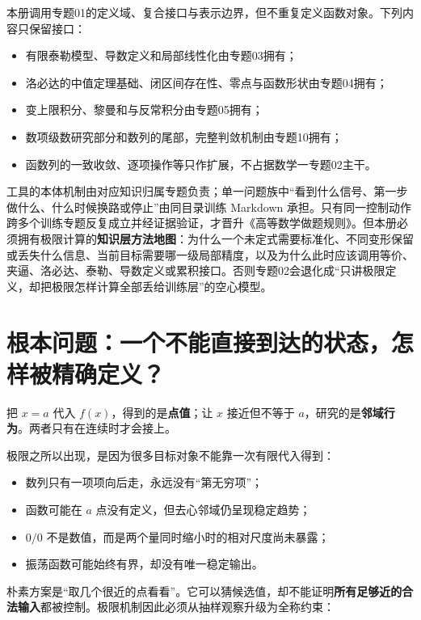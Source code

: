\documentclass[11pt,a4paper]{ctexart}
\newcommand{\kw}[1]{\textbf{\color{deep}#1}}
\begin{document}
本册调用专题01的定义域、复合接口与表示边界，但不重复定义函数对象。下列内容只保留接口：
\begin{itemize}
  \item 有限泰勒模型、导数定义和局部线性化由专题03拥有；
  \item 洛必达的中值定理基础、闭区间存在性、零点与函数形状由专题04拥有；
  \item 变上限积分、黎曼和与反常积分由专题05拥有；
  \item 数项级数研究部分和数列的尾部，完整判敛机制由专题10拥有；
  \item 函数列的一致收敛、逐项操作等只作扩展，不占据数学一专题02主干。
\end{itemize}

工具的本体机制由对应知识归属专题负责；单一问题族中“看到什么信号、第一步做什么、什么时候换路或停止”由同目录训练 Markdown 承担。只有同一控制动作跨多个训练专题反复成立并经证据验证，才晋升《高等数学做题规则》。但本册必须拥有极限计算的\textbf{知识层方法地图}：为什么一个未定式需要标准化、不同变形保留或丢失什么信息、当前目标需要哪一级局部精度，以及为什么此时应该调用等价、夹逼、洛必达、泰勒、导数定义或累积接口。否则专题02会退化成“只讲极限定义，却把极限怎样计算全部丢给训练层”的空心模型。

\section{根本问题：一个不能直接到达的状态，怎样被精确定义？}

把 $x=a$ 代入 $f(x)$，得到的是\kw{点值}；让 $x$ 接近但不等于 $a$，研究的是\kw{邻域行为}。两者只有在连续时才会接上。

极限之所以出现，是因为很多目标对象不能靠一次有限代入得到：
\begin{itemize}
  \item 数列只有一项项向后走，永远没有“第无穷项”；
  \item 函数可能在 $a$ 点没有定义，但去心邻域仍呈现稳定趋势；
  \item $0/0$ 不是数值，而是两个量同时缩小时的相对尺度尚未暴露；
  \item 振荡函数可能始终有界，却没有唯一稳定输出。
\end{itemize}

朴素方案是“取几个很近的点看看”。它可以猜候选值，却不能证明\textbf{所有足够近的合法输入}都被控制。极限机制因此必须从抽样观察升级为全称约束：
\end{document}
